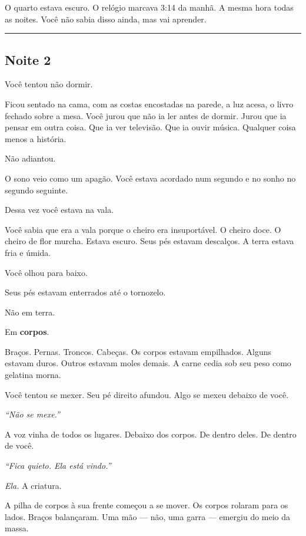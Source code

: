 \noindent O quarto estava escuro. O relógio marcava 3:14 da manhã. A mesma hora todas as noites. Você não sabia disso ainda, mas vai aprender.

\vspace{0.5em}\noindent\rule{\textwidth}{0.5pt}\vspace{0.5em}

\subsection*{Noite 2}

\noindent Você tentou não dormir.

\noindent Ficou sentado na cama, com as costas encostadas na parede, a luz acesa, o livro fechado sobre a mesa. Você jurou que não ia ler antes de dormir. Jurou que ia pensar em outra coisa. Que ia ver televisão. Que ia ouvir música. Qualquer coisa menos a história.

\noindent Não adiantou.

\noindent O sono veio como um apagão. Você estava acordado num segundo e no sonho no segundo seguinte.

\noindent Dessa vez você estava na vala.

\noindent Você sabia que era a vala porque o cheiro era insuportável. O cheiro doce. O cheiro de flor murcha. Estava escuro. Seus pés estavam descalços. A terra estava fria e úmida.

\noindent Você olhou para baixo.

\noindent Seus pés estavam enterrados até o tornozelo.

\noindent Não em terra.

\noindent Em \textbf{corpos}.

\noindent Braços. Pernas. Troncos. Cabeças. Os corpos estavam empilhados. Alguns estavam duros. Outros estavam moles demais. A carne cedia sob seu peso como gelatina morna.

\noindent Você tentou se mexer. Seu pé direito afundou. Algo se mexeu debaixo de você.

\noindent \textit{\textquotedblleft{}Não se mexe.\textquotedblright{}}

\noindent A voz vinha de todos os lugares. Debaixo dos corpos. De dentro deles. De dentro de você.

\noindent \textit{\textquotedblleft{}Fica quieto. Ela está vindo.\textquotedblright{}}

\noindent \textit{Ela.} A criatura.

\noindent A pilha de corpos à sua frente começou a se mover. Os corpos rolaram para os lados. Braços balançaram. Uma mão --- não, uma garra --- emergiu do meio da massa.

